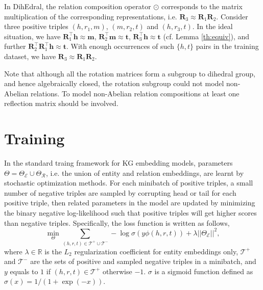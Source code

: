 \documentclass[11pt,a4paper]{article}
\begin{document}
In DihEdral, the relation composition operator $\odot$ corresponds to the matrix multiplication of the corresponding representations, i.e. $\bm{R}_3\approx\bm{R}_1\bm{R}_2$.
Consider three positive triples $(h,r_1,m)$, $(m, r_2, t)$ and $(h, r_3, t)$.  In the ideal situation, we have $\bm{R}_1^\top\bm{h}\approx \bm{m}$, $\bm{R}_2^\top\bm{m}\approx \bm{t}$, $\bm{R}_3^\top\bm{h}\approx \bm{t}$ (cf. Lemma \ref{th:equiv}), and further $\bm{R}_2^\top\bm{R}_1^\top\bm{h}\approx\bm{t}$. With enough occurrences of such $\{h,t\}$ pairs in the training dataset, we have $\bm{R}_3\approx\bm{R}_1\bm{R}_2$.

Note that although all the rotation matrices form a subgroup to dihedral group, and hence algebraically closed, the rotation subgroup could not model non-Abelian relations. To model non-Abelian relation compositions at least one reflection matrix should be involved.




























 \section{Training} \label{sec:training}







In the standard traing framework for KG embedding models,  parameters $\Theta = \Theta_{\mathcal{E}}\cup \Theta_{\mathcal{R}}$, i.e. the union of entity and relation embeddings, are learnt by stochastic optimization methods. For each minibatch of positive triples, a small number of negative triples are sampled by corrupting head or tail for each positive triple, then related parameters in the model are updated by minimizing the binary negative log-likelihood such that positive triples will get higher scores than negative triples.
Specifically, the loss function is written as follows,
\begin{equation} \label{eq: loss}
\min_{\Theta} \sum_{(h,r,t)\in\mathcal{T}^+\cup\mathcal{T}^-}-\log\sigma\left(y\phi(h,r,t)\right)
+ \lambda ||\Theta_{\mathcal{E}}||^2,
\end{equation}
where $\lambda \in \mathbb{R}$ is the $L_2$ regularization coefficient for entity embeddings only, $\mathcal{T}^+$ and $\mathcal{T}^-$ are the sets of positive and sampled negative  triples in a minibatch, and $y$ equals to $1$ if $(h,r,t)\in\mathcal{T}^+$ otherwise $-1$. $\sigma$ is a sigmoid function defined as $\sigma(x)=1/(1+\exp(-x))$.
\end{document}
